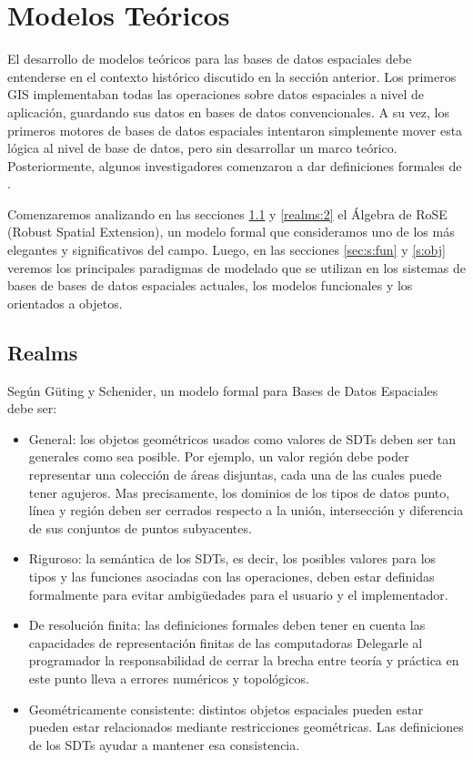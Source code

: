 \section{Modelos Teóricos} \label{sec:s:models}

El desarrollo de modelos teóricos para las bases de datos espaciales debe entenderse en el contexto histórico discutido en la sección anterior.
Los primeros GIS implementaban todas las operaciones sobre datos espaciales a nivel de aplicación, guardando sus datos en bases de datos convencionales.
A su vez, los primeros motores de bases de datos espaciales intentaron simplemente mover esta lógica al nivel de base de datos, pero sin desarrollar un marco teórico.
Posteriormente, algunos investigadores comenzaron a dar definiciones formales de .

Comenzaremos analizando en las secciones \ref{realms:1} y \ref{realms:2} el Álgebra de RoSE\textsuperscript{\cite{rose}} (Robust Spatial Extension), un modelo formal que consideramos uno de los más elegantes y significativos del campo.
Luego, en las secciones \ref{sec:s:fun} y \ref{s:obj} veremos los principales paradigmas de modelado que se utilizan en los sistemas de bases de bases de datos espaciales actuales, los modelos funcionales y los orientados a objetos.

\subsection{Realms} \label{realms:1}

Según Güting y Schenider\textsuperscript{\cite{rose}}, un modelo formal para Bases de Datos Espaciales debe ser:
\begin{itemize}
    \item General: los objetos geométricos usados como valores de SDTs deben ser tan generales como sea posible.
        Por ejemplo, un valor región debe poder representar una colección de áreas disjuntas, cada una de las cuales puede tener agujeros.
        Mas precisamente, los dominios de los tipos de datos punto, línea y región deben ser cerrados respecto a la unión,
        intersección y diferencia de sus conjuntos de puntos subyacentes.
    \item Riguroso: la semántica de los SDTs, es decir, los posibles valores para los tipos y las funciones asociadas con las operaciones,
        deben estar definidas formalmente para evitar ambigüedades para el usuario y el implementador.
    \item De resolución finita: las definiciones formales deben tener en cuenta las capacidades de representación finitas de las computadoras
        Delegarle al programador la responsabilidad de cerrar la brecha entre teoría y práctica en este punto lleva a errores numéricos y topológicos.
    \item Geométricamente consistente: distintos objetos espaciales pueden estar pueden estar relacionados mediante restricciones geométricas.
        Las definiciones de los SDTs ayudar a mantener esa consistencia.
\end{itemize}

